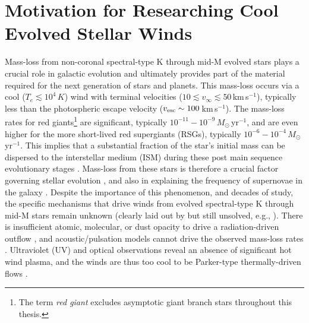 \section{Motivation for Researching Cool Evolved Stellar Winds}\label{sec:1.1}
Mass-loss from non-coronal spectral-type K through mid-M evolved stars plays a crucial role in galactic evolution and ultimately provides part of the material required for the next generation of stars and planets. This mass-loss occurs via a cool ($T_{e} \lesssim 10^4\,K$) wind with terminal velocities ($10 \lesssim v_{\infty} \lesssim 50$\,km\,s$^{-1}$), typically less than the photospheric escape velocity ($v_{\rm{esc}} \sim 100$\,km\,s$^{-1}$). The mass-loss rates for red giants\footnote{The term \textit{red giant} excludes asymptotic giant branch stars throughout this thesis.} are significant, typically $10^{-11}-10^{-9}$\,$M_{\odot}$\,yr$^{-1}$, and are even higher for the more short-lived red supergiants (RSGs), typically $10^{-6}-10^{-4}$\,$M_{\odot}$\,yr$^{-1}$. This implies that a substantial fraction of the star's initial mass can be dispersed to the interstellar medium (ISM) during these post main sequence evolutionary stages \citep[e.g.,][]{schroder_2001}. Mass-loss from these stars is therefore a crucial factor governing stellar evolution \citep{chiosi_1986}, and also in explaining the frequency of supernovae in the galaxy \citep[e.g.,][]{van_loon_2010}. Despite the importance of this phenomenon, and decades of study, the specific mechanisms that drive winds from evolved spectral-type K through mid-M stars remain unknown (clearly laid out by \citealt{holzer_1985} but still unsolved, e.g., \citealt{crowley_2009}). There is insufficient atomic, molecular, or dust opacity to drive a radiation-driven outflow \citep{zukerman_1995,jones_2008}, and acoustic/pulsation models cannot drive the observed mass-loss rates \citep{sutmann_1995}. Ultraviolet (UV) and optical observations reveal an absence of significant hot wind plasma, and the winds are thus too cool to be Parker-type thermally-driven flows \cite[e.g.,][]{linsky_1979,haisch_1980,ayres_1981}. 

